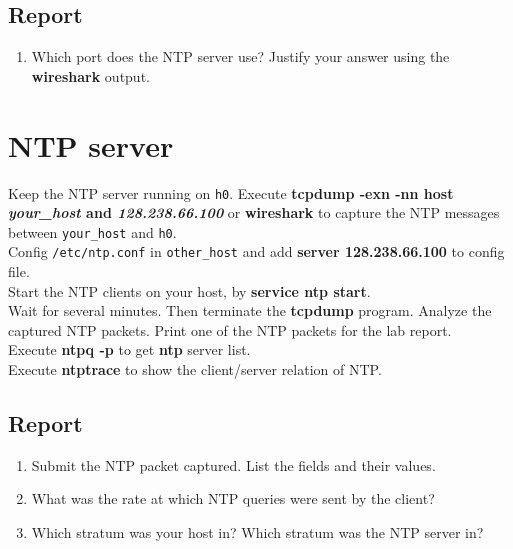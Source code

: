 \documentclass{../UTNetLab}
\begin{document}
    \subsection*{Report}
    \begin{enumerate}
        \item Which port does the NTP server use?
        Justify your answer using the \textbf{wireshark} output.
    \end{enumerate}

\section{NTP server}
    Keep the NTP server running on \texttt{h0}. Execute \textbf{tcpdump -exn -nn host \textit{your\_host} and \textit{128.238.66.100}} or \textbf{wireshark} to capture the NTP messages between \texttt{your\_host} and \texttt{h0}.\\
    Config \texttt{/etc/ntp.conf} in \texttt{other\_host} and add \textbf{server 128.238.66.100} to config file.\\
    Start the NTP clients on your host, by \textbf{service ntp start}.\\
    Wait for several minutes. Then terminate the \textbf{tcpdump} program. Analyze the captured NTP packets. Print one of the NTP packets for the lab report.\\
    Execute \textbf{ntpq -p} to get \textbf{ntp} server list.\\
    Execute \textbf{ntptrace} to show the client/server relation of NTP.\\

    \subsection*{Report}
    \begin{enumerate}
        \item Submit the NTP packet captured. List the fields and their values.
        \item What was the rate at which NTP queries were sent by the client?
        \item Which stratum was your host in? Which stratum was the NTP server in?
    \end{enumerate}
\end{document}
